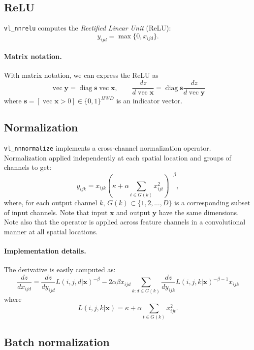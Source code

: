 \documentclass[12pt]{article}
\newcommand{\vv}{\operatorname{vec}}
\newcommand{\diag}{\operatorname{diag}}
\newcommand{\bx}{\mathbf{x}}
\newcommand{\by}{\mathbf{y}}
\newcommand{\bs}{\mathbf{s}}
\begin{document}
\subsection{ReLU}\label{s:relu}

\verb!vl_nnrelu! computes the \emph{Rectified Linear Unit} (ReLU):
\[
 y_{ijd} = \max\{0, x_{ijd}\}.
\]

\paragraph{Matrix notation.} With matrix notation, we can express the ReLU as
\[
\boxed{
\vv\by = \diag\bs \vv \bx,
\qquad
\frac{d z}{d \vv \bx}
=
\diag\bs
\frac{d z}{d \vv \by}
}
\]
where $\bs = [\vv \bx > 0] \in\{0,1\}^{HWD}$ is an indicator vector.

\subsection{Normalization}\label{s:normalization}

\verb!vl_nnnormalize! implements a cross-channel normalization operator. Normalization applied independently at each spatial location and groups of channels to get:
\[
 y_{ijk} = x_{ijk} \left( \kappa + \alpha \sum_{t\in G(k)} x_{ijt}^2 \right)^{-\beta},
\]
where, for each output channel $k$, $G(k) \subset \{1, 2, \dots, D\}$ is a corresponding subset of input channels. Note that input $\bx$ and output $\by$ have the same dimensions. Note also that the operator is applied across feature channels in a convolutional manner at all spatial locations.

\paragraph{Implementation details.} The derivative is easily computed as:
\[
\frac{dz}{d x_{ijd}}
=
\frac{dz}{d y_{ijd}}
L(i,j,d|\bx)^{-\beta}
-2\alpha\beta x_{ijd}
\sum_{k:d\in G(k)}
\frac{dz}{d y_{ijk}}
L(i,j,k|\bx)^{-\beta-1} x_{ijk} 
\]
where
\[
 L(i,j,k|\bx) = \kappa + \alpha \sum_{t\in G(k)} x_{ijt}^2.
\]

\subsection{Batch normalization}\label{s:bnorm}
\end{document}
